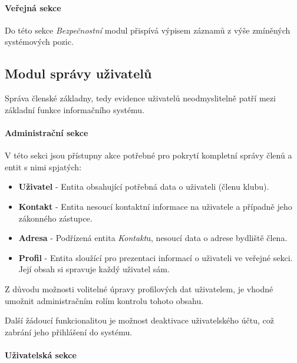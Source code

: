 \documentclass[11pt,oneside]{fithesis}
\begin{document}
            \paragraph*{Veřejná sekce}

            Do této sekce \textit{Bezpečnostní} modul přispívá výpisem záznamů z výše zmíněných systémových pozic.

            \subsection{Modul správy uživatelů}
            Správa členské základny, tedy evidence uživatelů neodmyslitelně patří mezi základní funkce informačního systému. 

            \paragraph*{Administrační sekce}

            V této sekci jsou přístupny akce potřebné pro pokrytí kompletní správy členů a entit s nimi spjatých:

            \begin{itemize}
                \item \textbf{Uživatel} - Entita obsahující potřebná data o uživateli (členu klubu). 
                \item \textbf{Kontakt} - Entita nesoucí kontaktní informace na uživatele a případně jeho zákonného zástupce.
                \item \textbf{Adresa} - Podřízená entita \textit{Kontakt}u, nesoucí data o adrese bydliště člena.
                \item \textbf{Profil} - Entita sloužící pro prezentaci  informací o uživateli ve veřejné sekci. Její obsah si spravuje každý uživatel sám.
            \end{itemize}

            Z důvodu možnosti volitelné úpravy profilových dat uživatelem, je vhodné umožnit administračním rolím kontrolu tohoto obsahu.

            Další žádoucí funkcionalitou je možnost deaktivace uživatelského účtu, což zabrání jeho přihlášení do systému.

            \paragraph*{Uživatelská sekce}
\end{document}
